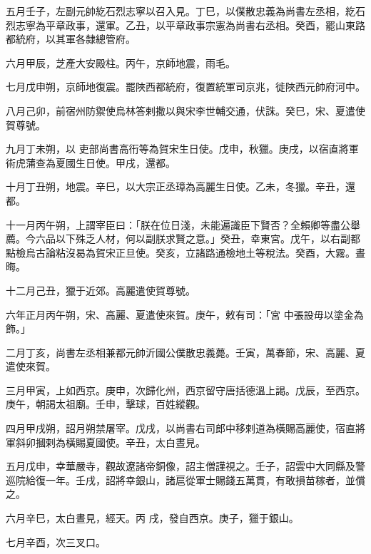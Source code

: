\begin{pinyinscope}
 五月壬子，左副元帥紇石烈志寧以召入見。丁巳，以僕散忠義為尚書左丞相，紇石烈志寧為平章政事，還軍。乙丑，以平章政事宗憲為尚書右丞相。癸酉，罷山東路都統府，以其軍各隸總管府。



 六月甲辰，芝產大安殿柱。丙午，京師地震，雨毛。



 七月戊申朔，京師地復震。罷陜西都統府，復置統軍司京兆，徙陜西元帥府河中。



 八月己卯，前宿州防禦使烏林答剌撒以與宋李世輔交通，伏誅。癸巳，宋、夏遣使賀尊號。



 九月丁未朔，以
 吏部尚書高衎等為賀宋生日使。戊申，秋獵。庚戌，以宿直將軍術虎蒲查為夏國生日使。甲戌，還都。



 十月丁丑朔，地震。辛巳，以大宗正丞璋為高麗生日使。乙未，冬獵。辛丑，還都。



 十一月丙午朔，上謂宰臣曰：「朕在位日淺，未能遍識臣下賢否？全賴卿等盡公舉薦。今六品以下殊乏人材，何以副朕求賢之意。」癸丑，幸東宮。戊午，以右副都點檢烏古論粘沒曷為賀宋正旦使。癸亥，立諸路通檢地土等稅法。癸酉，大霧。晝晦。



 十二月己丑，獵于近郊。高麗遣使賀尊號。



 六年正月丙午朔，宋、高麗、夏遣使來賀。庚午，敕有司：「宮
 中張設毋以塗金為飾。」



 二月丁亥，尚書左丞相兼都元帥沂國公僕散忠義薨。壬寅，萬春節，宋、高麗、夏遣使來賀。



 三月甲寅，上如西京。庚申，次歸化州，西京留守唐括德溫上謁。戊辰，至西京。庚午，朝謁太祖廟。壬申，擊球，百姓縱觀。



 四月甲戌朔，詔月朔禁屠宰。戊戌，以尚書右司郎中移剌道為橫賜高麗使，宿直將軍斜卯摑剌為橫賜夏國使。辛丑，太白晝見。



 五月戊申，幸華嚴寺，觀故遼諸帝銅像，詔主僧謹視之。壬子，詔雲中大同縣及警巡院給復一年。壬戌，詔將幸銀山，諸扈從軍士賜錢五萬貫，有敢損苗稼者，並償之。



 六月辛巳，太白晝見，經天。丙
 戌，發自西京。庚子，獵于銀山。



 七月辛酉，次三叉口。




\end{pinyinscope}
